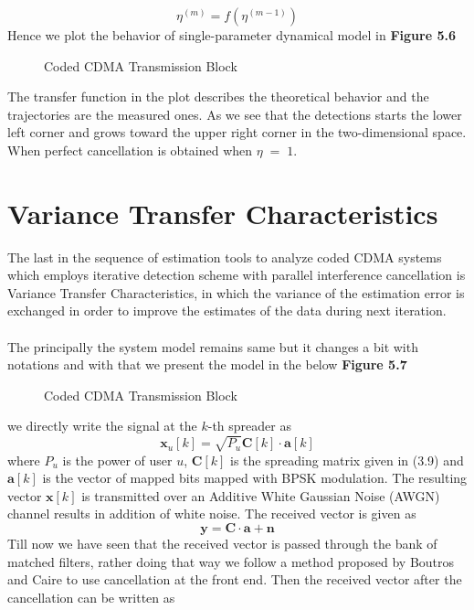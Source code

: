 \begin{equation}
\eta^{(m)}=f\left(\eta^{(m-1)}\right)
\end{equation}
Hence we plot the behavior of single-parameter dynamical model in \textbf{Figure 5.6}
\begin{figure}[htb]
\centerline{  }
\caption{Coded CDMA Transmission Block}
\end{figure}
The transfer function in the plot describes the theoretical behavior and the trajectories are the measured ones. As we see that the detections starts the lower left corner and grows toward the upper right corner in the two-dimensional space. When perfect cancellation is obtained when $\eta\;=\;1$.
\newpage
\section{Variance Transfer Characteristics}
The last in the sequence of estimation tools to analyze coded CDMA systems which employs iterative detection scheme with parallel interference cancellation is Variance Transfer Characteristics, in which the variance of the estimation error is exchanged in order to improve the estimates of the data during next iteration. \\ \\
The principally the system model remains same but it changes a bit with notations and with that we present the model in the below \textbf{Figure 5.7}
\begin{figure}[htb]
\centerline{  }
\caption{Coded CDMA Transmission Block}
\end{figure}
we directly write the signal at the $k$-th spreader as
\begin{equation}
\mathrm{\mathbf{x}}_u[k]=\sqrt{P_u}\mathrm{\mathbf{C}}[k]\cdot\mathrm{\mathbf{a}}[k]
\end{equation}
where $P_u$ is the power of user $u$, $\mathrm{\mathbf{C}}[k]$ is the spreading matrix given in (3.9) and $\mathrm{\mathbf{a}}[k]$ is the vector of mapped bits mapped with BPSK modulation. The resulting vector $\mathrm{\mathbf{x}}[k]$ is transmitted over an Additive White Gaussian Noise (AWGN) channel results in addition of white noise. The received vector is given as
\begin{equation}
\mathrm{\mathbf{y}}=\mathrm{\mathbf{C}}\cdot\mathrm{\mathbf{a}}+\mathrm{\mathbf{n}}
\end{equation}
Till now we have seen that the received vector is passed through the bank of matched filters, rather doing that way we follow a method proposed by Boutros and Caire to use cancellation at the front end. Then the received vector after the cancellation can be written as
